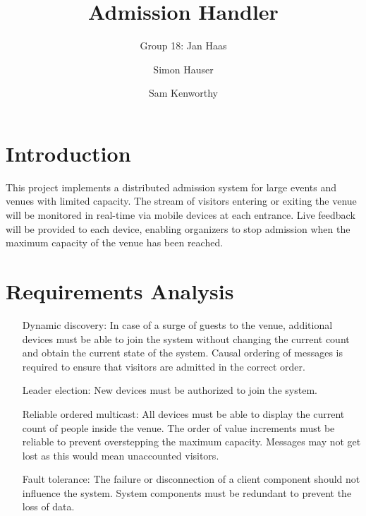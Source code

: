 \documentclass[runningheads]{llncs}
\begin{document}
%
\title{Admission Handler}

\author{Group 18: Jan Haas \and Simon Hauser \and Sam Kenworthy}

\institute{}
%
\maketitle              %

\section{Introduction}
This project implements a distributed admission system for large events and venues with limited capacity.
The stream of visitors entering or exiting the venue will be monitored in real-time via mobile devices at each entrance.
Live feedback will be provided to each device, enabling organizers to stop admission when the maximum capacity of the venue has been reached.

\section{Requirements Analysis}

\begin{itemize}
    \item [Dynamic discovery:] In case of a surge of guests to the venue, additional devices must be able to join the system without changing the current count and obtain the current state of the system. Causal ordering of messages is required to ensure that visitors are admitted in the correct order.
    \item [Leader election:] New devices must be authorized to join the system.
    \item [Reliable ordered multicast:] All devices must be able to display the current count of people inside the venue. The order of value increments must be reliable to prevent overstepping the maximum capacity. Messages may not get lost as this would mean unaccounted visitors.
    \item [Fault tolerance:] The failure or disconnection of a client component should not influence the system. System components must be redundant to prevent the loss of data.
\end{itemize}
\end{document}

